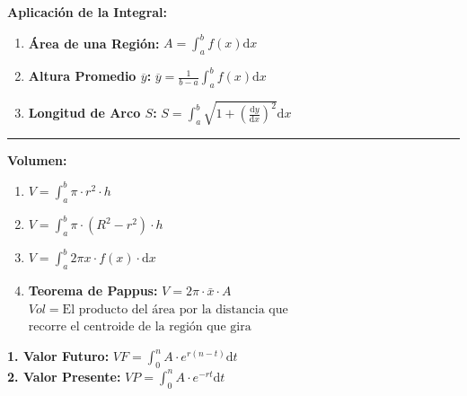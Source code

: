 \documentclass[10pt, letterpaper, landscape]{article}
\newcommand{\dd}{\mathrm{d}}
\newcommand{\deriv}[2]{\frac{\dd#1}{\dd#2}}
\begin{document}
\begin{minipage}[t]{8.3cm}
    \begin{tcolorbox}[colback=white, colframe=black, boxrule=0.5pt, arc=0pt, auto outer arc, left=2pt, right=2pt, top=2pt, bottom=2pt, boxsep=1pt, before=\vspace{4pt}, after=\vspace{4pt}]
        \textbf{\normalsize Aplicación de la Integral:}
        \begin{enumerate}[label=\arabic*., itemsep=2pt, leftmargin=12pt]
            \item \textbf{Área de una Región:} $A = \int_a^b f(x) \dd x$
            \item \textbf{Altura Promedio $\overline{y}$:} $\overline{y} = \frac{1}{b-a} \int_a^b f(x) \dd x$
            \item \textbf{Longitud de Arco $S$:} $S = \int_a^b \sqrt{1 + \left(\deriv{y}{x}\right)^2} \dd x$
        \end{enumerate}
        \hrule
        \vspace{0.1cm}
        \textbf{\normalsize Volumen:}
        \begin{enumerate}[label=\arabic*., itemsep=2pt, leftmargin=12pt]
            \item $V = \int_a^b \pi \cdot r^2 \cdot h$ 
            \item $V = \int_a^b \pi \cdot (R^2 - r^2) \cdot h$ 
            \item $V = \int_a^b 2\pi x \cdot f(x) \cdot \dd x$ 
            \item \textbf{Teorema de Pappus:} $V = 2\pi \cdot \bar{x} \cdot A$ \\ {\scriptsize $Vol = \text{El producto del área por la distancia que}$ $\text{recorre el centroide de la región que gira}$}
        \end{enumerate}
    \end{tcolorbox}

    \vspace{0.2cm}
    \noindent \textbf{1. Valor Futuro:} $VF = \int_0^n A \cdot e^{r(n-t)} \dd t$ \\
    \textbf{2. Valor Presente:} $VP = \int_0^n A \cdot e^{-rt} \dd t$
\end{minipage}
\end{document}
